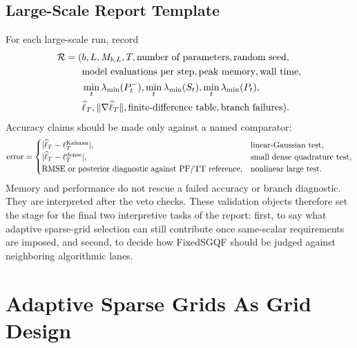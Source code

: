 \documentclass[11pt]{article}
\numberwithin{equation}{section}
\newcommand{\ellhat}{\widehat\ell}
\begin{document}
\subsection{Large-Scale Report Template}
\label{subsec:p32-large-scale-report}

For each large-scale run, record
\begin{equation}
\begin{aligned}
  \mathcal R
  =
  (&b,L,M_{b,L},T,\hbox{number of parameters},\hbox{random seed},\\
  &\hbox{model evaluations per step},\hbox{peak memory},\hbox{wall time},\\
  &\min_t\lambda_{\min}(P_t^-),
  \min_t\lambda_{\min}(S_t),
  \min_t\lambda_{\min}(P_t),\\
  &\ellhat_T,\|\nabla\ellhat_T\|,
  \hbox{finite-difference table},\hbox{branch failures}).
\end{aligned}
  \label{eq:p32-large-scale-report}
\end{equation}
Accuracy claims should be made only against a named comparator:
\begin{equation}
  \hbox{error}
  =
  \begin{cases}
  |\ellhat_T-\ell_T^{\rm Kalman}|, & \hbox{linear-Gaussian test},\\
  |\ellhat_T-\ell_T^{\rm dense}|, & \hbox{small dense quadrature test},\\
  \hbox{RMSE or posterior diagnostic against PF/TT reference}, &
  \hbox{nonlinear large test}.
  \end{cases}
  \label{eq:p32-comparator-errors}
\end{equation}
Memory and performance do not rescue a failed accuracy or branch diagnostic.
They are interpreted after the veto checks.  These validation objects therefore
set the stage for the final two interpretive tasks of the report: first, to say
what adaptive sparse-grid selection can still contribute once same-scalar
requirements are imposed, and second, to decide how FixedSGQF should be judged
against neighboring algorithmic lanes.

\section{Adaptive Sparse Grids As Grid Design}
\label{sec:p31-adaptive}
\end{document}
